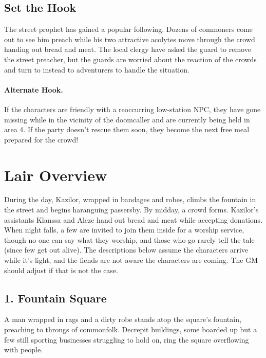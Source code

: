 \documentclass[10pt,a4paper,twoside,twocolumn,openany,bg=print,nodeprecatedcode]{dndbook}
\begin{document}
\subsection{Set the Hook}
The street prophet has gained a popular following. Dozens of commoners come out to see him preach while his two attractive acolytes move through the crowd handing out bread and meat. The local clergy have asked the guard to remove the street preacher, but the guards are worried about the reaction of the crowds and turn to instead to adventurers to handle the situation.
\paragraph{Alternate Hook.}
If the characters are friendly with a reoccurring low-station NPC, they have gone missing while in the vicinity of the doomcaller and are currently being held in area 4. If the party doesn't rescue them soon, they become the next free meal prepared for the crowd!
\section{Lair Overview}
During the day, Kazilor, wrapped in bandages and robes, climbs the fountain in the street and begins haranguing passersby. By midday, a crowd forms. Kazilor's assistants Klanssa and Alezc hand out bread and meat while accepting donations. When night falls, a few are invited to join them inside for a worship service, though no one can say what they worship, and those who go rarely tell the tale (since few get out alive).
The descriptions below assume the characters arrive while it's light, and the fiends are not aware the characters are coming. The GM should adjust if that is not the case.
\subsection{1. Fountain Square}
\begin{DndReadAloud}{}
A man wrapped in rags and a dirty robe stands atop the square's fountain, preaching to throngs of commonfolk. Decrepit buildings, some boarded up but a few still sporting businesses struggling to hold on, ring the square overflowing with people.
\end{DndReadAloud}
\end{document}

